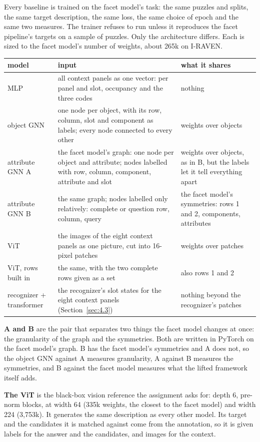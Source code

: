 Every baseline is trained on the facet model's task: the same puzzles and splits, the same target description, the same loss, the same choice of epoch and the same two measures. The trainer refuses to run unless it reproduces the facet pipeline's targets on a sample of puzzles. Only the architecture differs. Each is sized to the facet model's number of weights, about 265k on I-RAVEN.

\begin{center}\small
\begin{tabularx}{\linewidth}{@{}YYY@{}}
\toprule
model & input & what it shares \\
\midrule
MLP & all context panels as one vector: per panel and slot, occupancy and the three codes & nothing \\
object GNN & one node per object, with its row, column, slot and component as labels; every node connected to every other & weights over objects \\
attribute GNN A & the facet model's graph: one node per object and attribute; nodes labelled with row, column, component, attribute and slot & weights over objects, as in B, but the labels let it tell everything apart \\
attribute GNN B & the same graph; nodes labelled only relatively: complete or question row, column, query & the facet model's symmetries: rows 1 and 2, components, attributes \\
ViT & the images of the eight context panels as one picture, cut into 16-pixel patches & weights over patches \\
ViT, rows built in & the same, with the two complete rows given as a set & also rows 1 and 2 \\
recognizer + transformer & the recognizer's slot states for the eight context panels (Section~\ref{sec:4.3}) & nothing beyond the recognizer's patches \\
\bottomrule
\end{tabularx}
\end{center}

\textbf{A and B} are the pair that separates two things the facet model changes at once: the granularity of the graph and the symmetries. Both are written in PyTorch on the facet model's graph. B has the facet model's symmetries and A does not, so the object GNN against A measures granularity, A against B measures the symmetries, and B against the facet model measures what the lifted framework itself adds.

\textbf{The ViT} is the black-box vision reference the assignment asks for: depth 6, pre-norm blocks, at width 64 (335k weights, the closest to the facet model) and width 224 (3,753k). It generates the same description as every other model. Its target and the candidates it is matched against come from the annotation, so it is given labels for the answer and the candidates, and images for the context.

